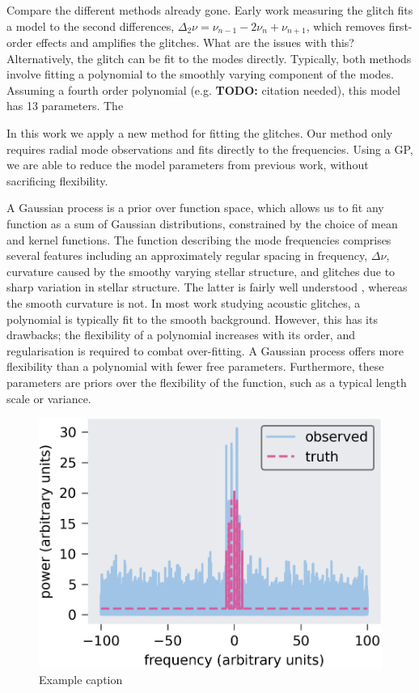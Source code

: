 \documentclass[linenumbers,modern,astrosymb,times]{aastex631}
\newcommand{\todo}[1]{{\color{todo} \textbf{TODO:} #1}}
\newcommand{\needcite}{\todo{citation needed}}
\newcommand{\figscale}{0.86}
\newcommand{\figscale}{1.0}
\begin{document}
Compare the different methods already gone. Early work measuring the glitch
fits a model to the second differences,
\(\Delta_2\nu = \nu_{n-1} - 2\nu_n + \nu_{n+1}\),
which removes first-order effects and amplifies the glitches. What are the
issues with this? Alternatively,
the glitch can be fit to the modes directly. Typically, both methods involve
fitting a polynomial to the smoothly varying component of the modes. Assuming
a fourth order polynomial (e.g. \needcite), this model has 13 parameters. The

In this work we apply a new method for fitting the glitches. Our method only
requires radial mode observations and fits directly to the frequencies. Using
a GP, we are able to reduce the model parameters from previous work, without
sacrificing flexibility.

A Gaussian process is a prior over function space, which allows us to fit any
function as a sum of Gaussian distributions, constrained by the choice of mean and kernel
functions. The function describing the mode frequencies comprises several
features including an approximately regular spacing in frequency,
\(\Delta\nu\), curvature caused by the smoothy varying stellar structure, and
glitches due to sharp variation in stellar structure. The latter is fairly well
understood \citep{Houdek:2007}, whereas the smooth curvature is not. In
most work studying acoustic glitches, a polynomial is typically fit
to the smooth background. However, this has its drawbacks; the flexibility
of a polynomial increases with its order, and regularisation is required to
combat over-fitting. A Gaussian process offers more flexibility than a
polynomial with fewer free parameters. Furthermore, these parameters are priors
over the flexibility of the function, such as a typical length scale or
variance.

\begin{figure}
    \centering
    \includegraphics[scale=\figscale]{example-single}
    \caption{Example caption}
\end{figure}
\end{document}
